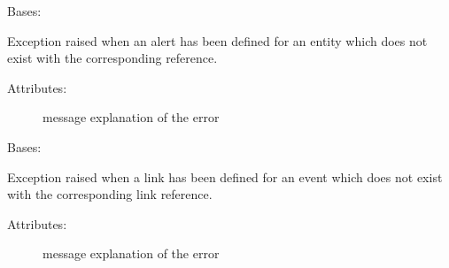 
\begin{fulllineitems}
\label{\detokenize{eboa.engine:eboa.engine.errors.UndefinedEntityReference}}
Bases: {\hyperref[\detokenize{eboa.engine:eboa.engine.errors.Error}]{}}

Exception raised when an alert has been defined for an entity which does not exist with the corresponding reference.
\begin{description}
\item[{Attributes:}] \leavevmode
message \textendash{} explanation of the error

\end{description}

\end{fulllineitems}


\begin{fulllineitems}
\label{\detokenize{eboa.engine:eboa.engine.errors.UndefinedEventLink}}
Bases: {\hyperref[\detokenize{eboa.engine:eboa.engine.errors.Error}]{}}

Exception raised when a link has been defined for an event which does not exist with the corresponding link reference.
\begin{description}
\item[{Attributes:}] \leavevmode
message \textendash{} explanation of the error

\end{description}

\end{fulllineitems}


